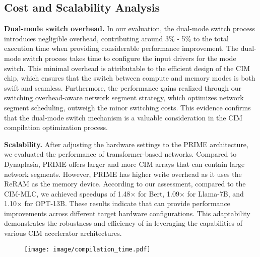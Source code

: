
%  

\subsection{Cost and Scalability Analysis}
\noindent\textbf{Dual-mode switch overhead.}
In our evaluation, the dual-mode switch process introduces negligible overhead, contributing around 3\% - 5\% to the total execution time when providing considerable performance improvement. 
The dual-mode switch process takes time to configure the input drivers for the mode switch. 
This minimal overhead is attributable to the efficient design of the CIM chip, which ensures that the switch between compute and memory modes is both swift and seamless. 
Furthermore, the performance gains realized through our switching overhead-aware network segment strategy, which optimizes network segment scheduling, outweigh the minor switching costs. This evidence confirms that the dual-mode switch mechanism
is a valuable consideration in the CIM compilation optimization process. 

\noindent\textbf{Scalability.}
After adjusting the hardware settings to the PRIME \cite{chi2016prime} architecture, we evaluated the performance of transformer-based networks. Compared to Dynaplasia, PRIME offers larger and more CIM arrays that can contain large network segments. 
However, PRIME has higher write overhead as it uses the ReRAM as the memory device. 
According to our assessment, compared to the CIM-MLC, we achieved speedups of 1.48$\times$ for Bert, 1.09$\times$ for Llama-7B, and 1.10$\times$ for OPT-13B. 
These results indicate that \name can provide performance improvements across different target hardware configurations. This adaptability demonstrates the robustness and efficiency of \name in leveraging the capabilities of various CIM accelerator architectures.


\begin{figure}[t]
    \centering
    \texttt{[image: image/compilation\_time.pdf]}
    \caption{}
    \label{fig:overhead}
\end{figure}
